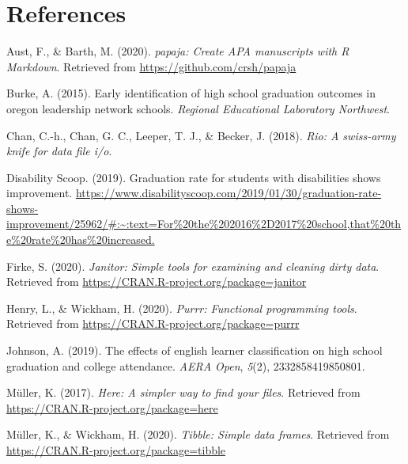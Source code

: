 \documentclass[
  english,
  man, fleqn, noextraspace]{apa6}
\begin{document}
\newpage

\hypertarget{references}{%
\section{References}\label{references}}

\begingroup
\setlength{\parindent}{-0.5in}
\setlength{\leftskip}{0.5in}

\hypertarget{refs}{}
\leavevmode\hypertarget{ref-R-papaja}{}%
Aust, F., \& Barth, M. (2020). \emph{papaja: Create APA manuscripts with R Markdown}. Retrieved from \url{https://github.com/crsh/papaja}

\leavevmode\hypertarget{ref-burke2015early}{}%
Burke, A. (2015). Early identification of high school graduation outcomes in oregon leadership network schools. \emph{Regional Educational Laboratory Northwest}.

\leavevmode\hypertarget{ref-R-rio}{}%
Chan, C.-h., Chan, G. C., Leeper, T. J., \& Becker, J. (2018). \emph{Rio: A swiss-army knife for data file i/o}.

\leavevmode\hypertarget{ref-Graduati54:online}{}%
Disability Scoop. (2019). Graduation rate for students with disabilities shows improvement. \url{https://www.disabilityscoop.com/2019/01/30/graduation-rate-shows-improvement/25962/\#:~:text=For\%20the\%202016\%2D2017\%20school,that\%20the\%20rate\%20has\%20increased.}

\leavevmode\hypertarget{ref-R-janitor}{}%
Firke, S. (2020). \emph{Janitor: Simple tools for examining and cleaning dirty data}. Retrieved from \url{https://CRAN.R-project.org/package=janitor}

\leavevmode\hypertarget{ref-R-purrr}{}%
Henry, L., \& Wickham, H. (2020). \emph{Purrr: Functional programming tools}. Retrieved from \url{https://CRAN.R-project.org/package=purrr}

\leavevmode\hypertarget{ref-johnson2019effects}{}%
Johnson, A. (2019). The effects of english learner classification on high school graduation and college attendance. \emph{AERA Open}, \emph{5}(2), 2332858419850801.

\leavevmode\hypertarget{ref-R-here}{}%
Müller, K. (2017). \emph{Here: A simpler way to find your files}. Retrieved from \url{https://CRAN.R-project.org/package=here}

\leavevmode\hypertarget{ref-R-tibble}{}%
Müller, K., \& Wickham, H. (2020). \emph{Tibble: Simple data frames}. Retrieved from \url{https://CRAN.R-project.org/package=tibble}
\end{document}
